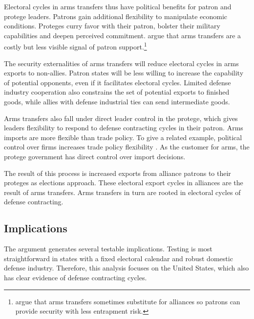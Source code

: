 \documentclass[12pt]{article}
\begin{document}
Electoral cycles in arms transfers thus have political benefits for patron and protege leaders.
Patrons gain additional flexibility to manipulate economic conditions.
Proteges curry favor with their patron, bolster their military capabilities and deepen perceived commitment. 
\citet{McManusYarhi-Milo2017} argue that arms transfers are a costly but less visible signal of patron support.\footnote{\citet{Yarhi-Miloetal2016} argue that arms transfers sometimes substitute for alliances so patrons can provide security with less entrapment risk.}


The security externalities of arms transfers will reduce electoral cycles in arms exports to non-allies. 
Patron states will be less willing to increase the capability of potential opponents, even if it facilitates electoral cycles.
Limited defense industry cooperation also constrains the set of potential exports to finished goods, while allies with defense industrial ties can send intermediate goods.


Arms transfers also fall under direct leader control in the protege, which gives leaders flexibility to respond to defense contracting cycles in their patron.
Arms imports are more flexible than trade policy. 
To give a related example, political control over firms increases trade policy flexibility \citep{Davisetal2019}.
As the customer for arms, the protege government has direct control over import decisions.


The result of this process is increased exports from alliance patrons to their proteges as elections approach.
These electoral export cycles in alliances are the result of arms transfers. 
Arms transfers in turn are rooted in electoral cycles of defense contracting.





\subsection{Implications}



The argument generates several testable implications. 
Testing is most straightforward in states with a fixed electoral calendar and robust domestic defense industry. 
Therefore, this analysis focuses on the United States, which also has clear evidence of defense contracting cycles.
\end{document}
